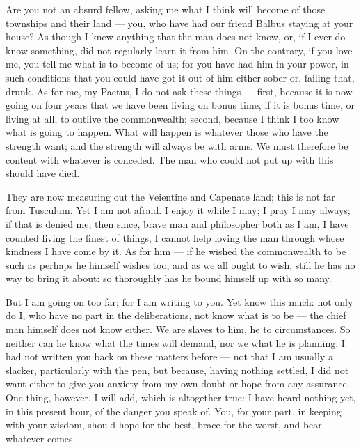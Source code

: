 

 Are you not an absurd fellow, asking me what I think will become of those townships and their land --- you, who have had our friend Balbus staying at your house? As though I knew anything that the man does not know, or, if I ever do know something, did not regularly learn it from him. On the contrary, if you love me, you tell me what is to become of us; for you have had him in your power, in such conditions that you could have got it out of him either sober or, failing that, drunk. As for me, my Paetus, I do not ask these things --- first, because it is now going on four years that we have been living on bonus time, if it is bonus time, or living at all, to outlive the commonwealth; second, because I think I too know what is going to happen. What will happen is whatever those who have the strength want; and the strength will always be with arms. We must therefore be content with whatever is conceded. The man who could not put up with this should have died.

 They are now measuring out the Veientine and Capenate land; this is not far from Tusculum. Yet I am not afraid. I enjoy it while I may; I pray I may always; if that is denied me, then since, brave man and philosopher both as I am, I have counted living the finest of things, I cannot help loving the man through whose kindness I have come by it. As for him --- if he wished the commonwealth to be such as perhaps he himself wishes too, and as we all ought to wish, still he has no way to bring it about: so thoroughly has he bound himself up with so many.

 But I am going on too far; for I am writing to you. Yet know this much: not only do I, who have no part in the deliberations, not know what is to be --- the chief man himself does not know either. We are slaves to him, he to circumstances. So neither can he know what the times will demand, nor we what he is planning. I had not written you back on these matters before --- not that I am usually a slacker, particularly with the pen, but because, having nothing settled, I did not want either to give you anxiety from my own doubt or hope from any assurance. One thing, however, I will add, which is altogether true: I have heard nothing yet, in this present hour, of the danger you speak of. You, for your part, in keeping with your wisdom, should hope for the best, brace for the worst, and bear whatever comes.
